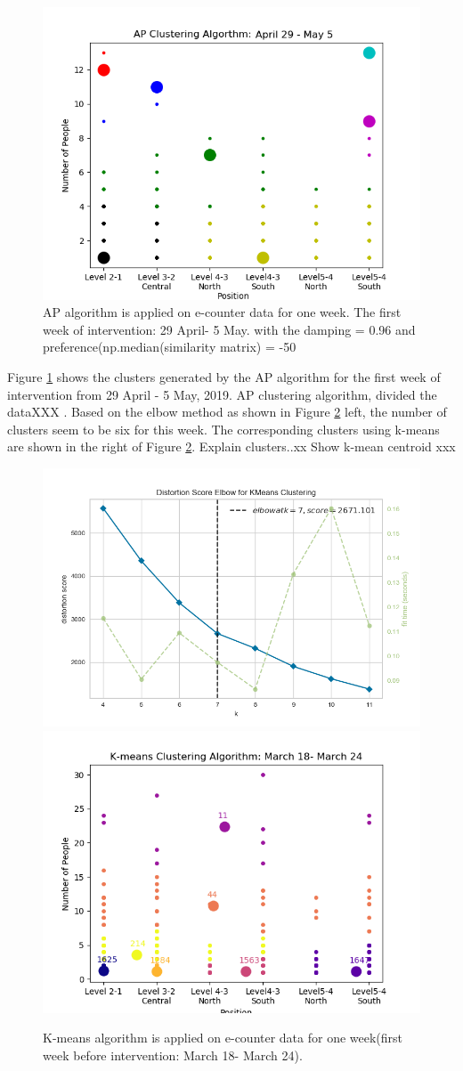 \documentclass[../UNBThesis2.tex]{subfiles}
\begin{document}
\begin{figure}[!h]
    \centering
    \includegraphics[width = 11 cm]{image/Chapters/Chapter6/ApFirstWeekIntervention.png}
    \caption{AP algorithm is applied on e-counter data for one week. The first week of intervention: 29 April- 5 May. with the damping = 0.96 and preference(np.median(similarity matrix) = -50 }
    \label{oneweek}
\end{figure}
    
Figure \ref{oneweek} shows the clusters generated by the AP algorithm for the first week of intervention from 29 April - 5 May, 2019. AP clustering algorithm, divided the dataXXX .
Based on the elbow method as shown in Figure \ref{elbkmean} left, the number of clusters seem to be six for this week. The corresponding clusters using k-means  are shown in the right of Figure \ref{elbkmean}. Explain clusters..xx Show k-mean centroid xxx
 


\begin{figure}[!h]
    \centering
    \includegraphics[width=.49\textwidth]{image/Chapters/Chapter6/elbowBeforerInt.png}
    \includegraphics[width=.49\textwidth]{image/Chapters/Chapter6/kmeans1WeekBefore.png}
    \caption{K-means algorithm is applied on e-counter data for one week(first week before intervention: March 18- March 24).}
    \label{elbkmean}
\end{figure}   
   
\end{document}
